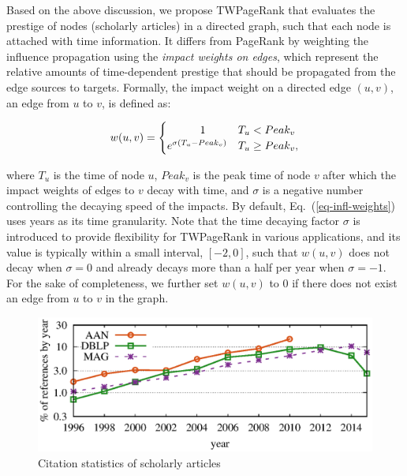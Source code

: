 Based on the above discussion, we propose TWPageRank that evaluates the prestige of nodes (\eg scholarly articles) in a directed graph, such that each node is attached with time information. It differs from PageRank by weighting the influence propagation using the {\em impact weights on edges}, which represent the relative amounts of time-dependent prestige that should be propagated from the edge sources to targets.
%
Formally, the impact weight on a directed edge $(u,v)$, \ie an edge from $u$ to $v$, is defined as:

\vspace{-2ex}
\begin{small}
\begin{equation} \label{eq-infl-weights}
w(u,v)  =  \begin{cases}  \hspace{7ex} 1 & T_u <  Peak_v \\
  e^{\sigma(T_u-Peak_v)} & T_u \geq Peak_v,
\end{cases}
\end{equation}
\end{small}
%
\noindent where $T_u$ is the time of node $u$, $Peak_v$ is the peak time of node $v$ after which the impact weights of edges to $v$ decay with time, and $\sigma$ is a negative number controlling the decaying speed of the impacts.
By default, Eq.~(\ref{eq-infl-weights}) uses years as its time granularity. Note that the time decaying factor $\sigma$ is introduced to provide flexibility for TWPageRank in various applications, and its value is typically within a small interval, \eg $[-2,0]$, such that $w(u,v)$ does not decay when $\sigma=0$ and already decays more than a half per year when $\sigma=-1$.
For the sake of completeness, we further set $w(u,v)$ to $0$ if there does not exist an edge from $u$ to $v$ in the graph.

\begin{figure}
\centering
\includegraphics[scale=0.5]{fig/yearly-references.eps}
\vspace{-2ex}
\caption{\small Citation statistics of scholarly articles}
\label{fig-reference}
\vspace{-3ex}
\end{figure}

